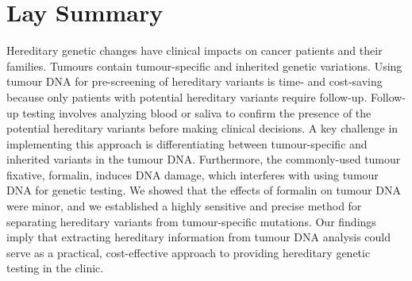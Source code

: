 
\chapter{Lay Summary}

Hereditary genetic changes have clinical impacts on cancer patients and their families. Tumours contain tumour-specific and inherited genetic variations. Using tumour DNA for pre-screening of hereditary variants is time- and cost-saving because only patients with potential hereditary variants require follow-up. Follow-up testing involves analyzing blood or saliva to confirm the presence of the potential hereditary variants before making clinical decisions. A key challenge in implementing this approach is differentiating between tumour-specific and inherited variants in the tumour DNA. Furthermore, the commonly-used tumour fixative, formalin, induces DNA damage, which interferes with using tumour DNA for genetic testing. We showed that the effects of formalin on tumour DNA were minor, and we established a highly sensitive and precise method for separating hereditary variants from tumour-specific mutations. Our findings imply that extracting hereditary information from tumour DNA analysis could serve as a practical, cost-effective approach to providing hereditary genetic testing in the clinic.
